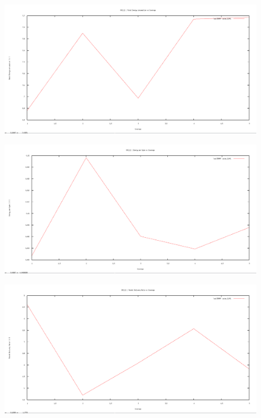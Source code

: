 \documentclass[12pt]{article}
\begin{document}
\begin{figure}[H]
	\centering
	\includegraphics[scale=	0.26]{image/802.15.4/Energyconsumption_vs_coverage.png}
\end{figure}

\begin{figure}[H]
	\centering
	\includegraphics[scale=	0.26]{image/802.15.4/Energyperbytes_vs_coverage.png}
\end{figure}

\begin{figure}[H]
	\centering
	\includegraphics[scale=	0.26]{image/802.15.4/Packetdeliveryratio_vs_coverage.png}
\end{figure}
\end{document}
